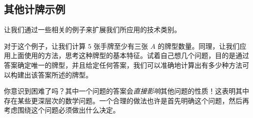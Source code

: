 
\subsection{其他计牌示例}

让我们通过一些相关的例子来扩展我们所应用的技术类别。\\

\begin{example}[至少三张 $A$]

    对于这个例子，让我们计算 $5$ 张手牌至少有三张 $A$ 的牌型数量。同理，让我们应用上面使用的方法，思考这种牌型的基本特征。试着自己想几个问题，目的是通过答案确定唯一的牌型，并且给定任何答案，我们可以准确地计算出有多少种方法可以构建出该答案所述的牌型。

    你意识到困难了吗？其中一个问题的答案会\emph{直接影响}其他问题的性质！这表明其中存在某些更深层次的数学问题。一个合理的做法也许是首先明确这个问题，然后再考虑围绕这个问题必须做出什么决定。


\end{example}
